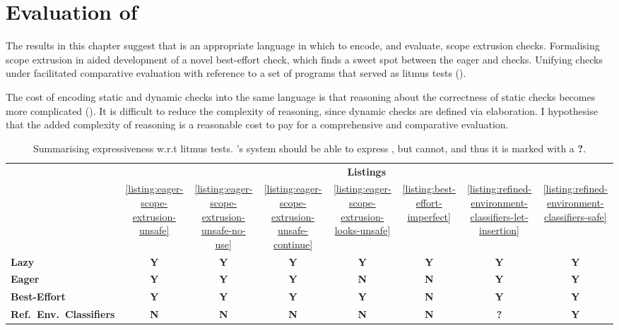 \section{Evaluation of \texorpdfstring{\sourceLang{}}{Lambda-Op-Quote-Splice}} \label{section:evaluation}
The results in this chapter suggest that \sourceLang{} is an appropriate language in which to encode, and evaluate, scope extrusion checks. Formalising scope extrusion in \sourceLang{} aided development of a novel best-effort check, which finds a sweet spot between the eager and checks. Unifying checks under \sourceLang{} facilitated comparative evaluation with reference to a set of \sourceLang{} programs that served as litmus tests ().

The cost of encoding static and dynamic checks into the same language is that reasoning about the correctness of static checks becomes more complicated (). It is difficult to reduce the complexity of reasoning, since dynamic checks are defined via elaboration. I hypothesise that the added complexity of reasoning is a reasonable cost to pay for a comprehensive and comparative evaluation.



\newcommand{\yes}{\textbf{\textcolor{splice}{\sffamily Y}}}
\newcommand{\no}{\textbf{\textcolor{quote}{\sffamily N}}}
\newcommand{\maybe}{\textbf{\textcolor{compile}{\sffamily ?}}}


\begin{table}
  \newcommand\T{\rule{0pt}{2.6ex}}       %
\newcommand\B{\rule[-1.2ex]{0pt}{0pt}} 
  \centering
  \begin{tabular}{l|c|c|c|c|c|c|c}
    & \multicolumn{7}{c}{\textbf{Listings}}
    \\[2mm] &
    \ref{listing:eager-scope-extrusion-unsafe}&
    \ref{listing:eager-scope-extrusion-unsafe-no-use} &
    \ref{listing:eager-scope-extrusion-unsafe-continue} &
    \ref{listing:eager-scope-extrusion-looks-unsafe} &
    \ref{listing:best-effort-imperfect} & 
    \ref{listing:refined-environment-classifiers-let-insertion} & 
    \ref{listing:refined-environment-classifiers-safe} \T\B\\ \hline 
    \textbf{Lazy} & \yes & \yes & \yes & \yes & \yes & \yes & \yes \T\B\\ 
    \textbf{Eager} & \yes & \yes & \yes & \no & \no & \yes & \yes  \T\B\\
    \textbf{Best-Effort} & \yes & \yes & \yes & \yes & \no & \yes & \yes \T\B\\
    \textbf{Ref.\ Env.\ Classifiers}& \no & \no & \no & \no & \no & \maybe & \yes \T\B\\ \hline
  \end{tabular}
  \caption{Summarising expressiveness w.r.t litmus tests. \citeauthor{isoda-24}'s system should be able to express , but \recLang{} cannot, and thus it is marked with a \maybe.}
  \label{table:expressiveness-comparison}
\end{table}

